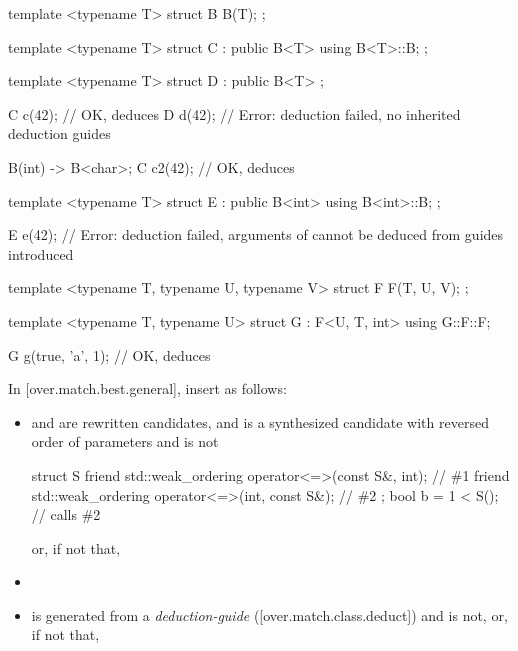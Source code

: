 \begin{adjustwidth}{0.5cm}{0.5cm}
\begin{addedblock}
\begin{example}
\begin{codeblock}
template <typename T> struct B {
  B(T);
};

template <typename T> struct C : public B<T> {
  using B<T>::B;
};

template <typename T> struct D : public B<T> {};

C c(42);  // OK, deduces 
D d(42);  // Error: deduction failed, no inherited deduction guides

B(int) -> B<char>;
C c2(42); // OK, deduces 

template <typename T> struct E : public B<int> {
  using B<int>::B;
};

E e(42);  // Error: deduction failed, arguments of  cannot be deduced from guides introduced

template <typename T, typename U, typename V> struct F {
  F(T, U, V);
};

template <typename T, typename U> struct G : F<U, T, int> {
  using G::F::F;
}

G g(true, 'a', 1); // OK, deduces 

\end{codeblock}
\end{example}
\end{addedblock}
\end{adjustwidth}

In [over.match.best.general], insert as follows:

\begin{adjustwidth}{0cm}{0.5cm}
\begin{itemize}
\item
{} and  are rewritten candidates, and
 is a synthesized candidate
with reversed order of parameters
and  is not
\begin{example}
\begin{codeblock}
struct S {
  friend std::weak_ordering operator<=>(const S&, int);         // \#1
  friend std::weak_ordering operator<=>(int, const S&);         // \#2
};
bool b = 1 < S();                                               // calls \#2
\end{codeblock}
\end{example}
or, if not that,


\item {}

\item
{} is generated from a
\emph{deduction-guide} ([over.match.class.deduct])
and  is not, or, if not that,
\end{itemize}
\end{adjustwidth}

